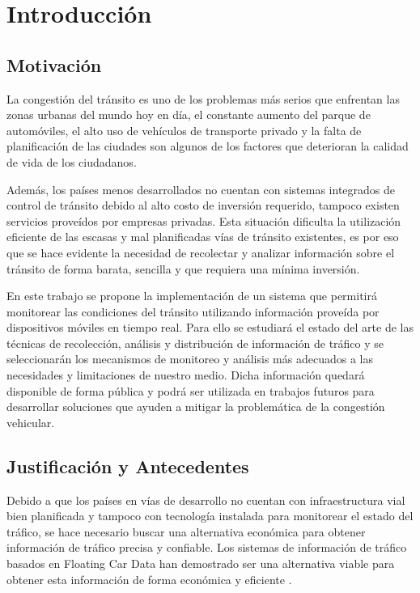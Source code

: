 \chapter{Introducción}

\section{Motivación}

La congestión del tránsito es uno de los problemas más serios que enfrentan las zonas urbanas del mundo hoy en día, el constante aumento del parque de automóviles, el alto uso de vehículos de transporte privado y la falta de planificación de las ciudades son algunos de los factores que deterioran la calidad de vida de los ciudadanos.

Además, los países menos desarrollados no cuentan con sistemas integrados de control de tránsito debido al alto costo de inversión requerido, tampoco existen servicios proveídos por empresas privadas. Esta situación dificulta la utilización eficiente de las escasas y mal planificadas vías de tránsito existentes, es por eso que se hace evidente la necesidad de recolectar y analizar información sobre el tránsito de forma barata, sencilla y que requiera una mínima inversión.

En este trabajo se propone la implementación de un sistema que permitirá monitorear las condiciones del tránsito utilizando información proveída por dispositivos móviles en tiempo real. Para ello se estudiará el estado del arte de las técnicas de recolección, análisis y distribución de información de tráfico y se seleccionarán los mecanismos de monitoreo y análisis más adecuados a las necesidades y limitaciones de nuestro medio. Dicha información quedará disponible de forma pública y podrá ser utilizada en trabajos futuros para desarrollar soluciones que ayuden a mitigar la problemática de la congestión vehicular.

\section{Justificación y Antecedentes}

Debido a que los países en vías de desarrollo no cuentan con infraestructura vial bien planificada y tampoco con tecnología 
instalada para monitorear el estado del tráfico, se hace necesario buscar una alternativa económica para obtener información de tráfico precisa y confiable. Los sistemas de información de tráfico basados en Floating Car Data han demostrado ser una alternativa viable para obtener esta información de forma económica y eficiente \cite{schafer2002traffic,reinthaler2007evaluation}.

